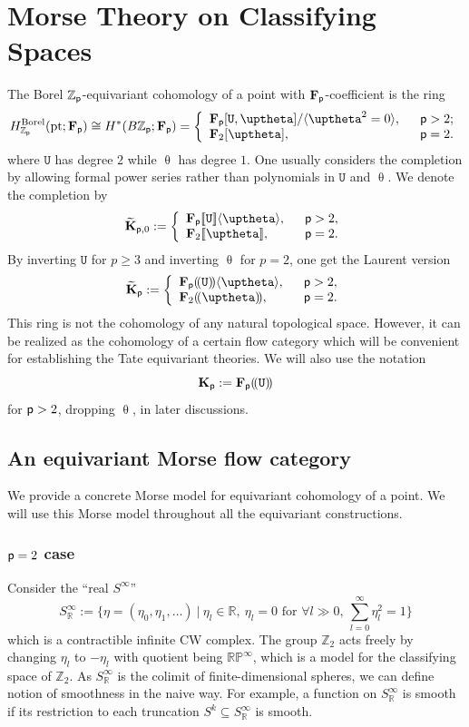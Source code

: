\documentclass[reqno, 10pt]{amsart}
\numberwithin{equation}{section}
\numberwithin{equation}{section}
\renewcommand{\subset}{\subseteq}
\theoremstyle{definition}
\theoremstyle{remark}
\newcommand{\beqn}{\begin{equation*}}
\newcommand{\eeqn}{\end{equation*}}
\newcommand{\mb}{\mathbb}
\newcommand{\p}{{\sf p}}
\newcommand{\fp}{{\bf F}_{\sf p}}
\newcommand{\kp}{{\bf K}_{\sf p}}
\newcommand{\tkp}{\wt{\bf K}_{\sf p}}
\newcommand{\zp}{{{\mb Z}_{\sf p}}}
\newcommand{\tu}{\mathtt{U}}
\newcommand{\psu}{{[\![\tu]\!]}}
\newcommand{\pst}{{[\![\uptheta]\!]}}
\newcommand{\lsu}{{(\!(\tu)\!)}}
\newcommand{\lst}{{(\!(\uptheta)\!)}}
\newcommand{\wt}{\widetilde}
\begin{document}
\section{Morse Theory on Classifying Spaces}

The Borel $\zp$-equivariant cohomology of a point with $\fp$-coefficient is the ring 
\beqn
H_{\zp}^{\rm Borel} ({\rm pt}; \fp) \cong H^*( B\zp; \fp) = \left\{ \begin{array}{ll} \fp [\tu, \uptheta]/  \langle \uptheta^2 = 0 \rangle,\ &\ \p > 2; \\
{\bf F}_2 [ \uptheta], &\ \p = 2.  \end{array}\right.
\eeqn
where $\tu$ has degree $2$ while $\uptheta$ has degree $1$. One usually considers the completion by allowing formal power series rather than polynomials in $\tu$ and $\uptheta$. We denote the completion by 
\beqn
\wt{\bf K}_{\p, 0}:= \left\{ \begin{array}{ll} \fp\psu\langle \uptheta \rangle,\ &\ \p > 2,\\
{\bf F}_2 \pst,\ &\ \p = 2.
\end{array}\right.
\eeqn
By inverting $\tu$ for $p \geq 3$ and inverting $\uptheta$ for $p=2$, one get the Laurent version
\beqn
\tkp:= \left\{ \begin{array}{ll} \fp\lsu \langle \uptheta \rangle,\ &\ \p>2,\\
{\bf F}_2 \lst,\ &\ \p = 2.\end{array}\right.
\eeqn
This ring is not the cohomology of any natural topological space. However, it can be realized as the cohomology of a certain flow category which will be convenient for establishing the Tate equivariant theories. We will also use the notation
\beqn
\kp := \fp\lsu
\eeqn
for $\p > 2$, dropping $\uptheta$, in later discussions.

\subsection{An equivariant Morse flow category}

We provide a concrete Morse model for equivariant cohomology of a point. We will use this Morse model throughout all the equivariant constructions.

\subsubsection{$\p=2$ case}

Consider the ``real $S^\infty$''
\beqn
S^\infty_{\mb R}:= \Big\{  \eta = (\eta_0,
 \eta_1, \ldots )\ |\ \eta_l \in {\mb R},\ \eta_l = 0 \text{ for }\forall l \gg 0,\ \sum_{l=0}^\infty \eta_l^2 = 1 \Big\}
\eeqn
which is a contractible infinite CW complex. The group ${\mb Z}_2$ acts freely by changing $\eta_l$ to $-\eta_l$ with quotient being $\mb{RP}^\infty$, which is a model for the classifying space of ${\mb Z}_2$. As $S_{\mb R}^\infty$ is the colimit of finite-dimensional spheres, we can define notion of smoothness in the naive way. For example, a function on $S_{\mb R}^\infty$ is smooth if its restriction to each truncation $S^k \subset S_{\mb R}^\infty$ is smooth. 
\end{document}
